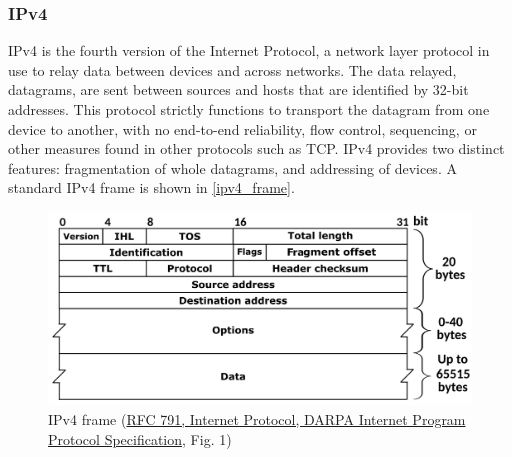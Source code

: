 \subsubsection{IPv4} IPv4 is the fourth version of the Internet Protocol, a network layer protocol in use to relay data between devices and across networks. The data relayed, datagrams, are sent between sources and hosts that are identified by 32-bit addresses. This protocol strictly functions to transport the datagram from one device to another, with no end-to-end reliability, flow control, sequencing, or other measures found in other protocols such as TCP. IPv4 provides two distinct features: fragmentation of whole datagrams, and addressing of devices. A standard IPv4 frame is shown in \autoref{ipv4_frame}.
\begin{figure}[H]
    \caption{IPv4 frame (\href{https://dx.doi.org/10.17487/RFC0791}{RFC 791, Internet Protocol, DARPA Internet Program Protocol Specification}, Fig. 1)}
    \label{ipv4_frame}
    \centering
    \includegraphics[width=\textwidth]{images/ipv4_frame.png}
\end{figure}

